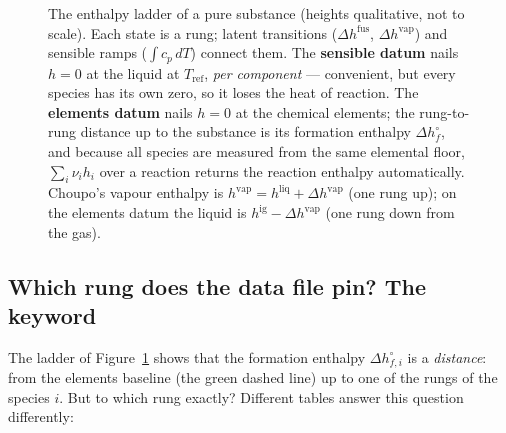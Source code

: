 \documentclass[11pt,a4paper]{article}
\begin{document}
\begin{figure}[ht]
\caption{The enthalpy ladder of a pure substance (heights qualitative,
not to scale).  Each state is a rung; latent transitions
($\Delta h^{\mathrm{fus}}$, $\Delta h^{\mathrm{vap}}$) and sensible
ramps ($\int c_p\,dT$) connect them.  The \textbf{sensible datum} nails
$h=0$ at the liquid at $T_{\mathrm{ref}}$, \emph{per component} ---
convenient, but every species has its own zero, so it loses the heat of
reaction.  The \textbf{elements datum} nails $h=0$ at the chemical
elements; the rung-to-rung distance up to the substance is its formation
enthalpy $\Delta h^{\circ}_f$, and because all species are measured from
the same elemental floor, $\sum_i \nu_i h_i$ over a reaction returns the
reaction enthalpy automatically.  Choupo's vapour enthalpy is
$h^{\mathrm{vap}} = h^{\mathrm{liq}} + \Delta h^{\mathrm{vap}}$ (one rung
up); on the elements datum the liquid is $h^{\mathrm{ig}} -
\Delta h^{\mathrm{vap}}$ (one rung down from the gas).}
\label{fig:enthalpy-ladder}
\end{figure}

\subsection{Which rung does the data file pin? The  keyword}
\label{sec:gibbs-phase}

The ladder of Figure~\ref{fig:enthalpy-ladder} shows that the formation
enthalpy $\Delta h^{\circ}_{f,i}$ is a \emph{distance}: from the elements
baseline (the green dashed line) up to one of the rungs of the species
$i$.  But to which rung exactly?  Different tables answer this question
differently:
\end{document}
